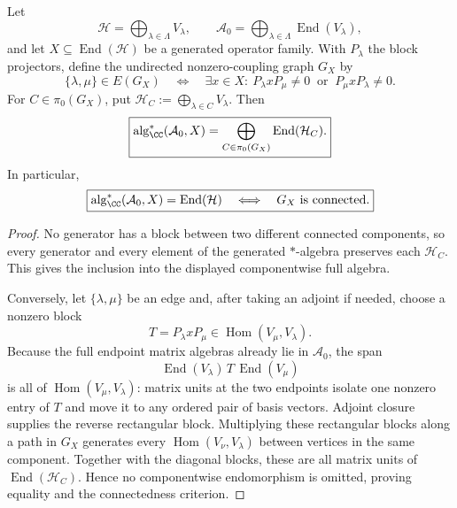\documentclass[12pt,a4paper]{article}
\begin{document}
\begin{theorem}
\label{p2c:thm:sector-coupling-graph-closure}
Let
\[
 \mathcal H=\bigoplus_{\lambda\in\Lambda}V_\lambda,
 \qquad
 \mathcal A_0=\bigoplus_{\lambda\in\Lambda}\operatorname{End}(V_\lambda),
\]
and let \(X\subseteq\operatorname{End}(\mathcal H)\) be a generated operator
family.  With \(P_\lambda\) the block projectors, define the undirected
nonzero-coupling graph \(G_X\) by
\[
 \{\lambda,\mu\}\in E(G_X)
 \quad\Longleftrightarrow\quad
 \exists x\in X:\
 P_\lambda xP_\mu\ne0\ \text{ or }\ P_\mu xP_\lambda\ne0.
\]
For \(C\in\pi_0(G_X)\), put
\(\mathcal H_C:=\bigoplus_{\lambda\in C}V_\lambda\).  Then
\[
 \boxed{
 \operatorname{alg}_{\CC}^{*}(\mathcal A_0,X)
 =\bigoplus_{C\in\pi_0(G_X)}\operatorname{End}(\mathcal H_C).}
\]
In particular,
\[
 \boxed{
 \operatorname{alg}_{\CC}^{*}(\mathcal A_0,X)
 =\operatorname{End}(\mathcal H)
 \quad\Longleftrightarrow\quad
 G_X\text{ is connected}.}
\]
\end{theorem}

\begin{proof}
No generator has a block between two different connected components, so every
generator and every element of the generated \(*\)-algebra preserves each
\(\mathcal H_C\).  This gives the inclusion into the displayed componentwise
full algebra.

Conversely, let \(\{\lambda,\mu\}\) be an edge and, after taking an adjoint if
needed, choose a nonzero block
\[
 T=P_\lambda xP_\mu
 \in\operatorname{Hom}(V_\mu,V_\lambda).
\]
Because the full endpoint matrix algebras already lie in \(\mathcal A_0\),
the span
\[
 \operatorname{End}(V_\lambda)\,T\,
 \operatorname{End}(V_\mu)
\]
is all of \(\operatorname{Hom}(V_\mu,V_\lambda)\): matrix units at the two
endpoints isolate one nonzero entry of \(T\) and move it to any ordered pair
of basis vectors.  Adjoint closure supplies the reverse rectangular block.
Multiplying these rectangular blocks along a path in \(G_X\) generates every
\(\operatorname{Hom}(V_\nu,V_\lambda)\) between vertices in the same
component.  Together with the diagonal blocks, these are all matrix units of
\(\operatorname{End}(\mathcal H_C)\).  Hence no componentwise endomorphism is
omitted, proving equality and the connectedness criterion.
\end{proof}
\end{document}
